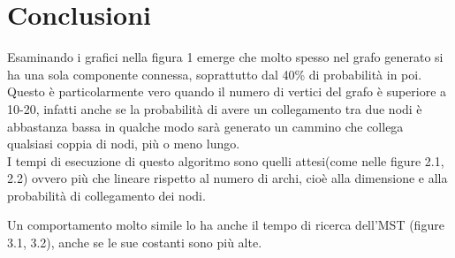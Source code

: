 \documentclass[
]{article}
\begin{document}
\hypertarget{conclusioni}{%
\section{Conclusioni}\label{conclusioni}}

Esaminando i grafici nella figura 1 emerge che molto spesso nel
grafo generato si ha una sola componente connessa, soprattutto dal 40\%
di probabilità in poi.\\
Questo è particolarmente vero quando il numero di vertici del grafo è
superiore a 10-20, infatti anche se la probabilità di avere un
collegamento tra due nodi è abbastanza bassa in qualche modo sarà
generato un cammino che collega qualsiasi coppia di nodi, più o meno
lungo.\\
I tempi di esecuzione di questo algoritmo sono quelli attesi(come nelle
figure 2.1, 2.2) ovvero più che lineare rispetto al numero di archi,
cioè alla dimensione e alla probabilità di collegamento dei nodi.

Un comportamento molto simile lo ha anche il tempo di ricerca
dell'MST (figure 3.1, 3.2), anche se le sue costanti sono più alte.
\end{document}
